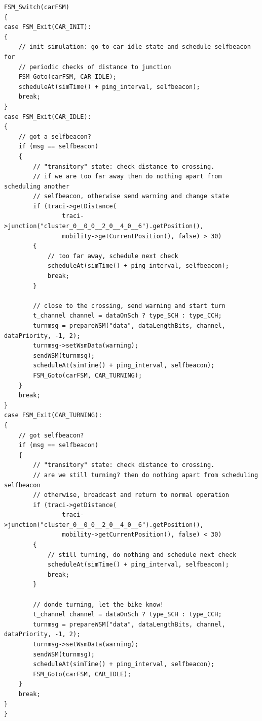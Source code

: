 \documentclass[11pt,letterpaper]{article}
\begin{document}
\begin{lstlisting}[style=CPP, label={lst:simple_car_fsm}, caption={Extracto del código encargado del comportamiento del automóvil.}]
FSM_Switch(carFSM)
{
case FSM_Exit(CAR_INIT):
{
	// init simulation: go to car idle state and schedule selfbeacon for
	// periodic checks of distance to junction
    FSM_Goto(carFSM, CAR_IDLE);
    scheduleAt(simTime() + ping_interval, selfbeacon);
    break;
}
case FSM_Exit(CAR_IDLE):
{
    // got a selfbeacon?
    if (msg == selfbeacon)
    {
		// "transitory" state: check distance to crossing.
		// if we are too far away then do nothing apart from scheduling another
		// selfbeacon, otherwise send warning and change state
        if (traci->getDistance(
                traci->junction("cluster_0__0_0__2_0__4_0__6").getPosition(),
                mobility->getCurrentPosition(), false) > 30)
        {
			// too far away, schedule next check
            scheduleAt(simTime() + ping_interval, selfbeacon);
            break;
        }

		// close to the crossing, send warning and start turn
        t_channel channel = dataOnSch ? type_SCH : type_CCH;
        turnmsg = prepareWSM("data", dataLengthBits, channel, dataPriority, -1, 2);
        turnmsg->setWsmData(warning);
        sendWSM(turnmsg);
        scheduleAt(simTime() + ping_interval, selfbeacon);
        FSM_Goto(carFSM, CAR_TURNING);
    }
    break;
}
case FSM_Exit(CAR_TURNING):
{
    // got selfbeacon?
    if (msg == selfbeacon)
	{
		// "transitory" state: check distance to crossing.
		// are we still turning? then do nothing apart from scheduling selfbeacon
		// otherwise, broadcast and return to normal operation
        if (traci->getDistance(
                traci->junction("cluster_0__0_0__2_0__4_0__6").getPosition(),
                mobility->getCurrentPosition(), false) < 30)
        {
			// still turning, do nothing and schedule next check
            scheduleAt(simTime() + ping_interval, selfbeacon);
            break;
        }

		// donde turning, let the bike know!
        t_channel channel = dataOnSch ? type_SCH : type_CCH;
        turnmsg = prepareWSM("data", dataLengthBits, channel, dataPriority, -1, 2);
        turnmsg->setWsmData(warning);
        sendWSM(turnmsg);
        scheduleAt(simTime() + ping_interval, selfbeacon);
        FSM_Goto(carFSM, CAR_IDLE);
    }
    break;
}
}
\end{lstlisting}
\end{document}
